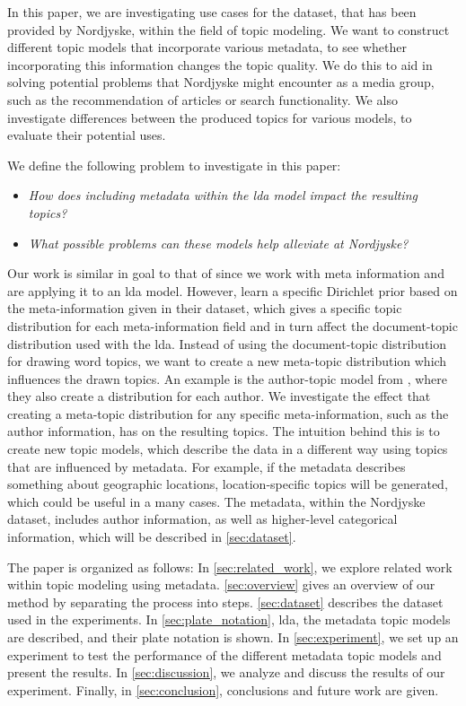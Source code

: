 In this paper, we are investigating use cases for the dataset, that has been provided by Nordjyske, within the field of topic modeling. 
We want to construct different topic models that incorporate various metadata, to see whether incorporating this information changes the topic quality.
We do this to aid in solving potential problems that Nordjyske might encounter as a media group, such as the recommendation of articles or search functionality.
We also investigate differences between the produced topics for various models, to evaluate their potential uses.

We define the following problem to investigate in this paper:

\begin{itemize}
	\item \textit{How does including metadata within the \gls{lda} model impact the resulting topics?}
	\item \textit{What possible problems can these models help alleviate at Nordjyske?}
\end{itemize}

Our work is similar in goal to that of \citet{MetaLDA2017} since we work with meta information and are applying it to an \gls{lda} model.
However, \citet{MetaLDA2017} learn a specific Dirichlet prior based on the meta-information given in their dataset, which gives a specific topic distribution for each meta-information field and in turn affect the document-topic distribution used with the \gls{lda}.
Instead of using the document-topic distribution for drawing word topics, we want to create a new meta-topic distribution which influences the drawn topics.
An example is the author-topic model from \citet{author_topic_2012}, where they also create a distribution for each author.
We investigate the effect that creating a meta-topic distribution for any specific meta-information, such as the author information, has on the resulting topics.
The intuition behind this is to create new topic models, which describe the data in a different way using topics that are influenced by metadata.
For example, if the metadata describes something about geographic locations, location-specific topics will be generated, which could be useful in a many cases.
The metadata, within the Nordjyske dataset, includes author information, as well as higher-level categorical information, which will be described in \autoref{sec:dataset}.

The paper is organized as follows:
In \autoref{sec:related_work}, we explore related work within topic modeling using metadata.
\autoref{sec:overview} gives an overview of our method by separating the process into steps.
\autoref{sec:dataset} describes the dataset used in the experiments.
In \autoref{sec:plate_notation}, \gls{lda}, the metadata topic models are described, and their plate notation is shown.
In \autoref{sec:experiment}, we set up an experiment to test the performance of the different metadata topic models and present the results.
In \autoref{sec:discussion}, we analyze and discuss the results of our experiment.
Finally, in \autoref{sec:conclusion}, conclusions and future work are given.
